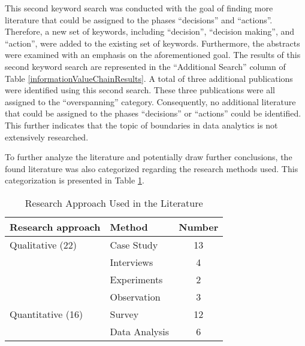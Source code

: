 This second keyword search was conducted with the goal of finding more literature that could be assigned to the phases \enquote{decisions} and \enquote{actions}. Therefore, a new set of keywords, including \enquote{decision}, \enquote{decision making}, and \enquote{action}, were added to the existing set of keywords. Furthermore, the abstracts were examined with an emphasis on the aforementioned goal. The results of this second keyword search are represented in the \enquote{Additional Search} column of Table \ref{informationValueChainResults}. A total of three additional publications were identified using this second search. These three publications were all assigned to the \enquote{overspanning} category. Consequently, no additional literature that could be assigned to the phases \enquote{decisions} or \enquote{actions} could be identified. This further indicates that the topic of boundaries in data analytics is not extensively researched.

To further analyze the literature and potentially draw further conclusions, the found literature was also categorized regarding the research methods used. This categorization is presented in Table \ref{researchMethod}.

\begin{table}[htbp]
    \centering
    \small
    \begin{tabular}{llc}
    \hline
    \multicolumn{1}{l}{Research approach} & \multicolumn{1}{l}{Method} & \multicolumn{1}{l}{Number} \\ \hline
    Qualitative (22)                      & Case Study                 & 13                         \\
                                          & Interviews                 & 4                          \\
                                          & Experiments                & 2                          \\
                                          & Observation                & 3                          \\
    Quantitative (16)                     & Survey                     & 12                         \\
                                          & Data Analysis              & 6                          \\ \hline
    \end{tabular}
    \caption{Research Approach Used in the Literature}
    \label{researchMethod}
    \end{table}

